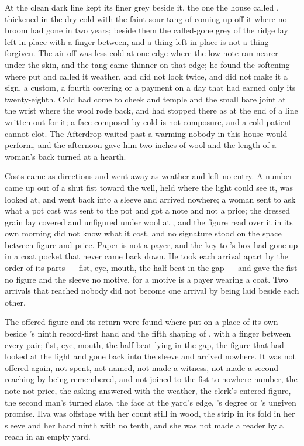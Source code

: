 At  the clean dark line kept its finer grey beside it, the one the house called , thickened in the dry cold with the faint sour tang of  coming up off it where no broom had gone in two years; beside them the called-gone grey of the ridge lay left in place with a finger between, and a thing left in place is not a thing forgiven. The air off  was less cold at one edge where the low note ran nearer under the skin, and the tang came thinner on that edge; he found the softening where put and called it weather, and did not look twice, and did not make it a sign, a custom, a fourth covering or a payment on a day that had earned only its twenty-eighth. Cold had come to cheek and temple and the small bare joint at the wrist where the wool rode back, and had stopped there as at the end of a line written out for it; a face composed by cold is not composure, and a cold patient cannot clot. The Afterdrop waited past a warming nobody in this house would perform, and the afternoon gave him two inches of wool and the length of a woman's back turned at a hearth.

\scenebreak

Costs came as directions and went away as weather and left no entry. A number came up out of a shut fist toward the well, held where the light could see it, was looked at, and went back into a sleeve and arrived nowhere; a woman sent to ask what a pot cost was sent to the pot and got a note and not a price; the dressed grain lay covered and unfigured under wool at , and the figure read over it in its own morning did not know what it cost, and no signature stood on the space between figure and price. Paper is not a payer, and the key to 's box had gone up in a coat pocket that never came back down. He took each arrival apart by the order of its parts --- fist, eye, mouth, the half-beat in the gap --- and gave the fist no figure and the sleeve no motive, for a motive is a payer wearing a coat. Two arrivals that reached nobody did not become one arrival by being laid beside each other.

The offered figure and its return were found where put on a place of its own beside 's ninth record-first hand and the fifth shaping of , with a finger between every pair; fist, eye, mouth, the half-beat lying in the gap, the figure that had looked at the light and gone back into the sleeve and arrived nowhere. It was not offered again, not spent, not named, not made a witness, not made a second reaching by being remembered, and not joined to the fist-to-nowhere number, the note-not-price, the asking answered with the weather, the clerk's entered figure, the second man's turned slate, the face at the yard's edge, 's degree or 's ungiven promise. Ilva was offstage with her count still in wood, the strip in its fold in her sleeve and her hand ninth with no tenth, and she was not made a reader by a reach in an empty yard.

